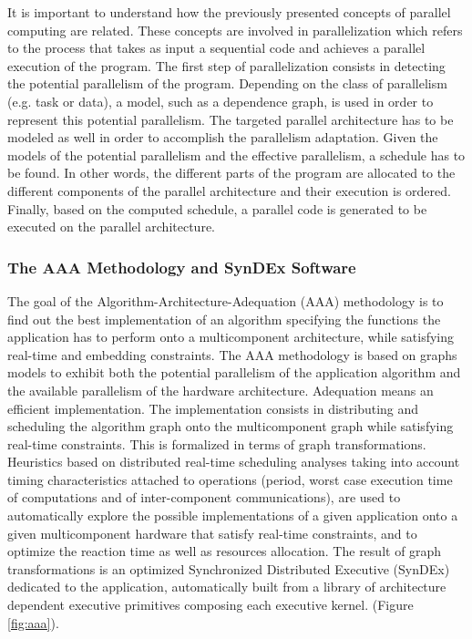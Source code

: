 It is important to understand how the previously presented concepts of parallel computing are related. These concepts are involved in parallelization which refers to the process that takes as input a sequential code and achieves a parallel execution of the program. The first step of parallelization consists in detecting the potential parallelism of the program. Depending on the class of parallelism (e.g. task or data), a model, such as a dependence graph, is used in order to represent this potential parallelism. The targeted parallel architecture has to be modeled as well in order to accomplish the parallelism adaptation. Given the models of the potential parallelism and the effective parallelism, a schedule has to be found. In other words, the different parts of the program are allocated to the different components of the parallel architecture and their execution is ordered. Finally, based on the computed schedule, a parallel code is generated to be executed on the parallel architecture.  

\subsubsection{The AAA Methodology and SynDEx Software}

The goal of the Algorithm-Architecture-Adequation (AAA) methodology \cite{sorel:1996} is to find out the best implementation of an algorithm specifying the functions the application has to perform onto a multicomponent architecture, while satisfying real-time and embedding constraints. The AAA methodology is based on graphs models to exhibit both the potential parallelism of the application algorithm and the available parallelism of the hardware architecture.  Adequation means an efficient implementation. The implementation consists in distributing and scheduling the algorithm graph onto the multicomponent graph while satisfying real-time constraints. This is formalized in terms of graph transformations. Heuristics based on distributed real-time scheduling analyses taking into account timing characteristics attached to operations (period, worst case execution time of computations and of inter-component communications), are used to automatically explore the possible implementations of a given application onto a given multicomponent hardware that satisfy real-time constraints, and to optimize the reaction time as well as resources allocation. The result of graph transformations is an optimized Synchronized Distributed Executive (SynDEx) dedicated to the application, automatically built from a library of architecture dependent executive primitives composing each executive kernel. (Figure \ref{fig:aaa}).

